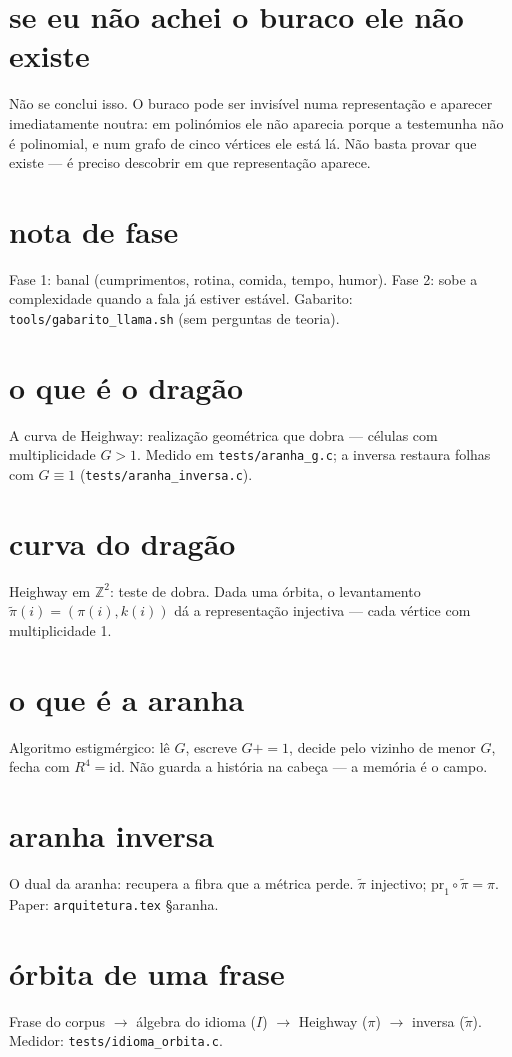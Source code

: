 \documentclass[11pt,a4paper]{article}
\newcommand{\code}[1]{\texttt{\small #1}}
\begin{document}
\section{se eu não achei o buraco ele não existe}
Não se conclui isso. O buraco pode ser invisível numa representação e aparecer
imediatamente noutra: em polinómios ele não aparecia porque a testemunha não é polinomial,
e num grafo de cinco vértices ele está lá. Não basta provar que existe — é preciso
descobrir em que representação aparece.

\section{nota de fase}
Fase 1: banal (cumprimentos, rotina, comida, tempo, humor).
Fase 2: sobe a complexidade quando a fala já estiver estável.
Gabarito: \code{tools/gabarito\_llama.sh} (sem perguntas de teoria).


\section{o que é o dragão}
A curva de Heighway: realização geométrica que dobra --- células com multiplicidade $G>1$.
Medido em \code{tests/aranha\_g.c}; a inversa restaura folhas com $G\equiv1$
(\code{tests/aranha\_inversa.c}).

\section{curva do dragão}
Heighway em $\mathbb{Z}^{2}$: teste de dobra. Dada uma órbita, o levantamento
$\tilde\pi(i)=(\pi(i),k(i))$ dá a representação injectiva --- cada vértice com
multiplicidade 1.

\section{o que é a aranha}
Algoritmo estigmérgico: lê $G$, escreve $G{+}{=}1$, decide pelo vizinho de menor $G$,
fecha com $R^{4}=\mathrm{id}$. Não guarda a história na cabeça --- a memória é o campo.

\section{aranha inversa}
O dual da aranha: recupera a fibra que a métrica perde. $\tilde\pi$ injectivo;
$\mathrm{pr}_{1}\circ\tilde\pi=\pi$. Paper: \code{arquitetura.tex} §aranha.

\section{órbita de uma frase}
Frase do corpus $\to$ álgebra do idioma ($I$) $\to$ Heighway ($\pi$) $\to$ inversa ($\tilde\pi$).
Medidor: \code{tests/idioma\_orbita.c}.
\end{document}
